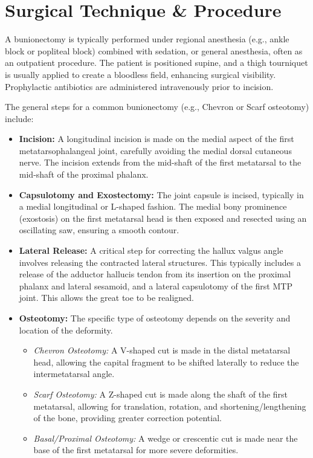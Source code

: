 \section*{Surgical Technique \& Procedure}
A bunionectomy is typically performed under regional anesthesia (e.g., ankle block or popliteal block) combined with sedation, or general anesthesia, often as an outpatient procedure. The patient is positioned supine, and a thigh tourniquet is usually applied to create a bloodless field, enhancing surgical visibility. Prophylactic antibiotics are administered intravenously prior to incision.

The general steps for a common bunionectomy (e.g., Chevron or Scarf osteotomy) include:
\begin{itemize}
  \item \textbf{Incision:} A longitudinal incision is made on the medial aspect of the first metatarsophalangeal joint, carefully avoiding the medial dorsal cutaneous nerve. The incision extends from the mid-shaft of the first metatarsal to the mid-shaft of the proximal phalanx.
  \item \textbf{Capsulotomy and Exostectomy:} The joint capsule is incised, typically in a medial longitudinal or L-shaped fashion. The medial bony prominence (exostosis) on the first metatarsal head is then exposed and resected using an oscillating saw, ensuring a smooth contour.
  \item \textbf{Lateral Release:} A critical step for correcting the hallux valgus angle involves releasing the contracted lateral structures. This typically includes a release of the adductor hallucis tendon from its insertion on the proximal phalanx and lateral sesamoid, and a lateral capsulotomy of the first MTP joint. This allows the great toe to be realigned.
  \item \textbf{Osteotomy:} The specific type of osteotomy depends on the severity and location of the deformity.
    \begin{itemize}
      \item \textit{Chevron Osteotomy:} A V-shaped cut is made in the distal metatarsal head, allowing the capital fragment to be shifted laterally to reduce the intermetatarsal angle.
      \item \textit{Scarf Osteotomy:} A Z-shaped cut is made along the shaft of the first metatarsal, allowing for translation, rotation, and shortening/lengthening of the bone, providing greater correction potential.
      \item \textit{Basal/Proximal Osteotomy:} A wedge or crescentic cut is made near the base of the first metatarsal for more severe deformities.

\end{itemize}
\end{itemize}
